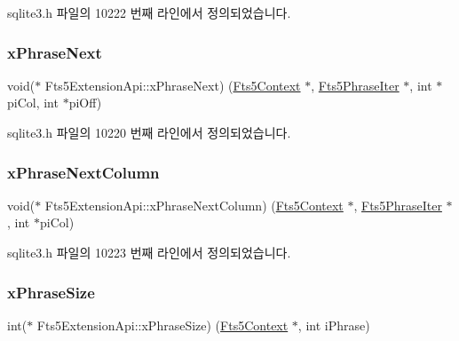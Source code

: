 sqlite3.\+h 파일의 10222 번째 라인에서 정의되었습니다.

\mbox{\label{struct_fts5_extension_api_ac46faf7ccccf6a02454069b296dc1877}} 
\subsubsection{\texorpdfstring{x\+Phrase\+Next}{xPhraseNext}}
{\footnotesize\ttfamily void($\ast$ Fts5\+Extension\+Api\+::x\+Phrase\+Next) (\hyperlink{sqlite3_8h_a97821b95ebebd43db901977ffd5b26bc}{Fts5\+Context} $\ast$, \hyperlink{struct_fts5_phrase_iter}{Fts5\+Phrase\+Iter} $\ast$, int $\ast$pi\+Col, int $\ast$pi\+Off)}



sqlite3.\+h 파일의 10220 번째 라인에서 정의되었습니다.

\mbox{\label{struct_fts5_extension_api_ae699a91c958cbac92a2ae8000670ef89}} 
\subsubsection{\texorpdfstring{x\+Phrase\+Next\+Column}{xPhraseNextColumn}}
{\footnotesize\ttfamily void($\ast$ Fts5\+Extension\+Api\+::x\+Phrase\+Next\+Column) (\hyperlink{sqlite3_8h_a97821b95ebebd43db901977ffd5b26bc}{Fts5\+Context} $\ast$, \hyperlink{struct_fts5_phrase_iter}{Fts5\+Phrase\+Iter} $\ast$, int $\ast$pi\+Col)}



sqlite3.\+h 파일의 10223 번째 라인에서 정의되었습니다.

\mbox{\label{struct_fts5_extension_api_aeda6faa66f47f9116c9ceba882aaedd2}} 
\subsubsection{\texorpdfstring{x\+Phrase\+Size}{xPhraseSize}}
{\footnotesize\ttfamily int($\ast$ Fts5\+Extension\+Api\+::x\+Phrase\+Size) (\hyperlink{sqlite3_8h_a97821b95ebebd43db901977ffd5b26bc}{Fts5\+Context} $\ast$, int i\+Phrase)}



